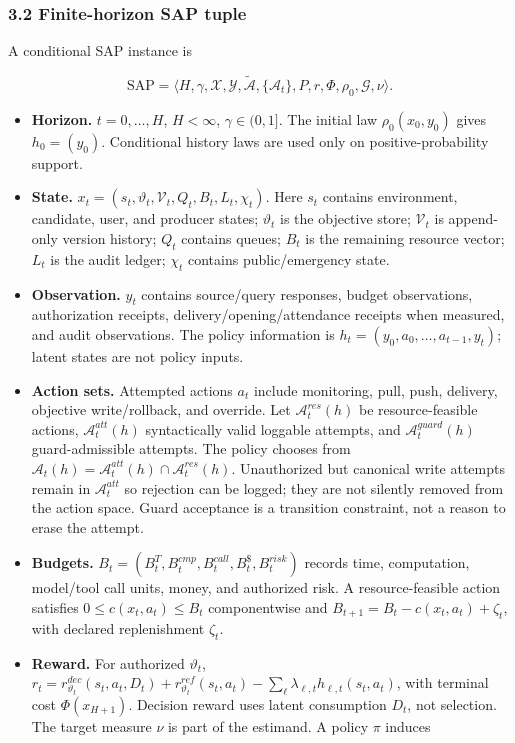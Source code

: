 \documentclass[
  11pt]{article}
\providecommand{\tightlist}{%
  \setlength{\itemsep}{0pt}\setlength{\parskip}{0pt}}
\begin{document}
\subsubsection{3.2 Finite-horizon SAP
tuple}\label{finite-horizon-sap-tuple}

A conditional SAP instance is

\[\mathrm{SAP}=\langle H,\gamma,\mathcal X,\mathcal Y,\widetilde{\mathcal A},\{\mathcal A_t\},P,r,\Phi,\rho_0,\mathcal G,\nu\rangle.\tag{1}\]

\begin{itemize}
\tightlist
\item
  \textbf{Horizon.} \(t=0,\ldots,H\), \(H<\infty\), \(\gamma\in(0,1]\).
  The initial law \(\rho_0(x_0,y_0)\) gives \(h_0=(y_0)\). Conditional
  history laws are used only on positive-probability support.
\item
  \textbf{State.}
  \(x_t=(s_t,\vartheta_t,\mathcal V_t,Q_t,B_t,L_t,\chi_t)\). Here
  \(s_t\) contains environment, candidate, user, and producer states;
  \(\vartheta_t\) is the objective store; \(\mathcal V_t\) is
  append-only version history; \(Q_t\) contains queues; \(B_t\) is the
  remaining resource vector; \(L_t\) is the audit ledger; \(\chi_t\)
  contains public/emergency state.
\item
  \textbf{Observation.} \(y_t\) contains source/query responses, budget
  observations, authorization receipts, delivery/opening/attendance
  receipts when measured, and audit observations. The policy information
  is \(h_t=(y_0,a_0,\ldots,a_{t-1},y_t)\); latent states are not policy
  inputs.
\item
  \textbf{Action sets.} Attempted actions \(a_t\) include monitoring,
  pull, push, delivery, objective write/rollback, and override. Let
  \(\mathcal A^{res}_t(h)\) be resource-feasible actions,
  \(\mathcal A^{att}_t(h)\) syntactically valid loggable attempts, and
  \(\mathcal A^{guard}_t(h)\) guard-admissible attempts. The policy
  chooses from
  \(\mathcal A_t(h)=\mathcal A^{att}_t(h)\cap\mathcal A^{res}_t(h)\).
  Unauthorized but canonical write attempts remain in
  \(\mathcal A^{att}_t\) so rejection can be logged; they are not
  silently removed from the action space. Guard acceptance is a
  transition constraint, not a reason to erase the attempt.
\item
  \textbf{Budgets.}
  \(B_t=(B_t^T,B_t^{cmp},B_t^{call},B_t^{\$},B_t^{risk})\) records time,
  computation, model/tool call units, money, and authorized risk. A
  resource-feasible action satisfies \(0\le c(x_t,a_t)\le B_t\)
  componentwise and \(B_{t+1}=B_t-c(x_t,a_t)+\zeta_t\), with declared
  replenishment \(\zeta_t\).
\item
  \textbf{Reward.} For authorized \(\vartheta_t\),
  \(r_t=r^{dec}_{\vartheta_t}(s_t,a_t,D_t)+r^{ref}_{\vartheta_t}(s_t,a_t)-\sum_\ell\lambda_{\ell,t}h_{\ell,t}(s_t,a_t)\),
  with terminal cost \(\Phi(x_{H+1})\). Decision reward uses latent
  consumption \(D_t\), not selection. The target measure \(\nu\) is part
  of the estimand. A policy \(\pi\) induces
\end{itemize}
\end{document}
